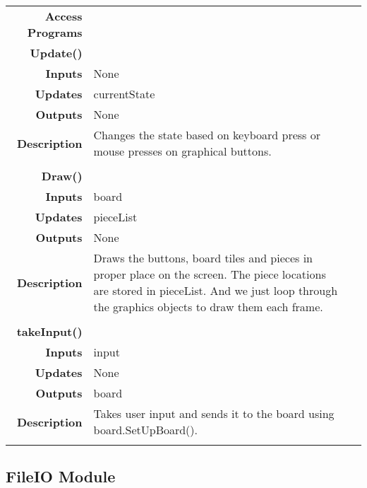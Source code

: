 \documentclass[10pt]{article}
\makeatletter
\newcommand{\CustomLabel}[1]{\Hy@raisedlink{\hypertarget{#1}{}}\label{#1}}
\makeatother
\begin{document}
\begin{tabularx}{\linewidth}{ >{\bfseries}r Xp{5cm} }
            Access Programs & \begin{tabular}[t]{@{} l p{8cm}} 
                                     & \\
                                    \bf{Update()} & \\
                                    Inputs &  None \\
                                    Updates & currentState \\
                                    Outputs & None \\
                                    Description & Changes the state based on keyboard press or mouse presses on graphical buttons.\\
                                     & \\
                                    \bf{Draw()} & \\
                                    Inputs & board \\
                                    Updates & pieceList \\
                                    Outputs & None \\
                                    Description & Draws the buttons, board tiles and pieces in proper place on the screen. The piece locations are stored in pieceList. And we just loop through the graphics objects to draw them each frame. \\
                                     & \\
                                    \bf{takeInput()} & \\
                                    Inputs & input \\
                                    Updates & None \\
                                    Outputs & board \\ 
                                    Description & Takes user input and sends it to the board using board.SetUpBoard().\\
                              \end{tabular} \\
                              
        \end{tabularx}







\subsection{FileIO Module}\CustomLabel{mis:LoadSave}
\end{document}
